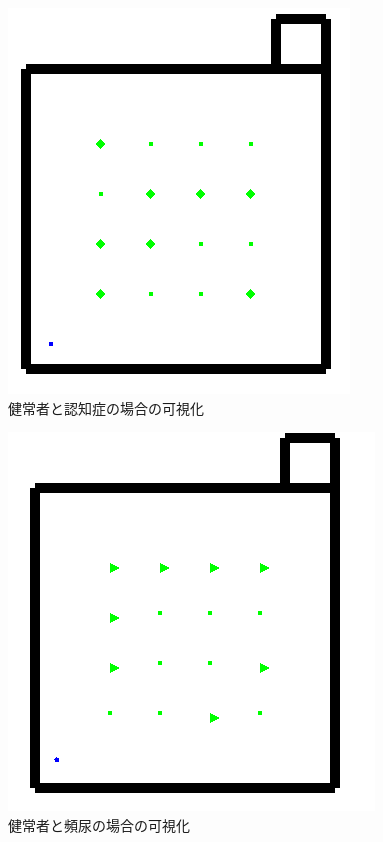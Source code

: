 \begin{figure}[htb]
\begin{center}
 \includegraphics[scale=0.5]{figures/health_urinate.png}
 \caption[健常者と認知症の場合の可視化]{健常者と認知症の場合の可視化 \label{health_urinate}}
\end{center}
\end{figure}

\begin{figure}[htb]
\begin{center}
 \includegraphics[scale=0.5]{figures/health_frequently_urinate_v1.png}
 \caption[健常者と頻尿の場合の可視化]{健常者と頻尿の場合の可視化 \label{health_frequently_urinate_v1}}
\end{center}
\end{figure}

